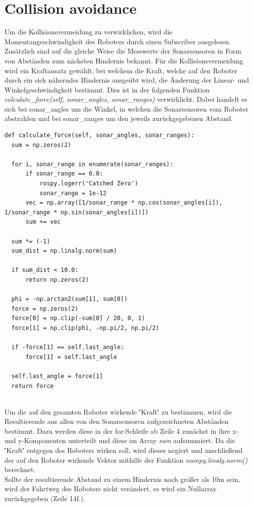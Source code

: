 \documentclass[12pt, a4paper]{report}
\begin{document}
\section{Collision avoidance}
Um die Kollisionsvermeidung zu verwirklichen, wird die Momentangeschwindigkeit des Roboters durch einen Subscriber ausgelesen. Zusätzlich sind auf die gleiche Weise die Messwerte der Sonarsensoren in Form von Abständen zum nächsten Hindernis bekannt.
Für die Kollisionsvermeidung wird ein Kraftansatz gewählt, bei welchem die Kraft, welche auf den Roboter durch ein sich näherndes Hindernis ausgeübt wird, die Änderung der Linear- und Winkelgeschwindigkeit bestimmt. Dies ist in der folgenden Funktion \textit{calculate\_force(self, sonar\_angles, sonar\_ranges)} verwirklicht. Dabei handelt es sich bei sonar\_angles um die Winkel, in welchen die Sonarsensoren vom Roboter abstrahlen und bei sonar\_ranges um den jeweils zurückgegebenen Abstand.
\begin{lstlisting}
def calculate_force(self, sonar_angles, sonar_ranges):
  sum = np.zeros(2)

  for i, sonar_range in enumerate(sonar_ranges):
      if sonar_range == 0.0:
          rospy.logerr('Catched Zero')
          sonar_range = 1e-12
      vec = np.array([1/sonar_range * np.cos(sonar_angles[i]), 1/sonar_range * np.sin(sonar_angles[i])])
      sum += vec
          
  sum *= (-1)
  sum_dist = np.linalg.norm(sum)
       
  if sum_dist < 10.0:
      return np.zeros(2)

  phi = -np.arctan2(sum[1], sum[0])
  force = np.zeros(2)
  force[0] = np.clip(-sum[0] / 20, 0, 1)
  force[1] = np.clip(phi, -np.pi/2, np.pi/2)

  if -force[1] == self.last_angle:
      force[1] = self.last_angle

  self.last_angle = force[1]
  return force
  
\end{lstlisting}
Um die auf den gesamten Roboter wirkende \''Kraft\'' zu bestimmen, wird die Resultierende aus allen von den Sonarsensoren aufgezeichneten Abständen bestimmt. Dazu werden diese in der for-Schleife ab Zeile 4 zunächst in ihre x- und y-Komponenten unterteilt und diese im Array \textit{sum} aufsummiert. Da die \''Kraft\'' entgegen des Roboters wirken soll, wird dieses negiert und anschließend der auf den Roboter wirkende Vektor mithilfe der Funktion \textit{numpy.linalg.norm()} berechnet.\\
Sollte der resultierende Abstand zu einem Hindernis noch größer als 10m sein, wird der Fahrtweg des Roboters nicht verändert, es wird ein Nullarray zurückgegeben $($Zeile 14f.$)$.\\
\end{document}
